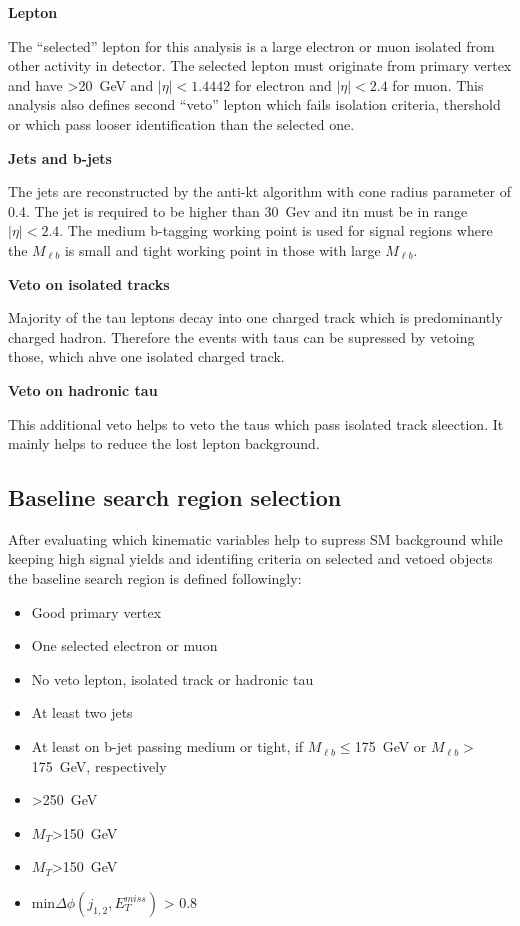 \textbf{Lepton}

The ``selected'' lepton for this analysis is a large \pt electron or muon isolated from other activity in detector. The selected lepton must originate from primary vertex and have \pt>20~GeV and $|\eta|<1.4442$ for electron and $|\eta|<2.4$ for muon. This analysis also defines second ``veto'' lepton which fails isolation criteria, \pt thershold or which pass looser identification than the selected one. 

\textbf{Jets and b-jets}

The jets are reconstructed by the anti-kt algorithm with cone radius parameter of 0.4. The jet \pt is required to be higher than 30~Gev and itn must be in range $|\eta|<2.4$. The medium b-tagging working point is used for signal regions where the $M_{\ell b}$ is small and tight working point in those with large $M_{\ell b}$.  

\textbf{Veto on isolated tracks}

Majority of the tau leptons decay into one charged track which is predominantly charged hadron. Therefore the events with taus can be supressed by vetoing those, which ahve one isolated charged track.

\textbf{Veto on hadronic tau}

This additional veto helps to veto the taus which pass isolated track sleection. It mainly helps to reduce the lost lepton background.

\subsection{Baseline search region selection~\label{sec:baseline}}

After evaluating which kinematic variables help to supress SM background while keeping high signal yields and identifing criteria on selected and vetoed objects the baseline search region is defined followingly:

\begin{itemize}

\item Good primary vertex
\item One selected electron or muon
\item No veto lepton, isolated track or hadronic tau
\item At least two jets
\item At least on b-jet passing medium or tight, if $M_{\ell b} \leq$175~GeV or $M_{\ell b}>$175~GeV, respectively
\item \MET>250~GeV
\item $M_{T}$>150~GeV
\item $M_{T}$>150~GeV
\item min$\Delta \phi (j_{1,2}, E_{T}^{miss})$ > 0.8

\end{itemize}

